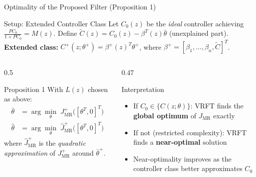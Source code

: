 \documentclass[aspectratio=169]{beamer}
\newcommand{\highlight}[1]{{\color{accentblue}\textbf{#1}}}
\begin{document}
\begin{frame}{Optimality of the Proposed Filter (Proposition 1)}
  \begin{block}{Setup: Extended Controller Class}
    Let $C_0(z)$ be the \emph{ideal} controller achieving $\frac{PC_0}{1+PC_0}=M(z)$.
    Define $\tilde{C}(z) = C_0(z) - \beta^T(z)\bar{\theta}$\; (unexplained part).\\[0.4em]
    \textbf{Extended class:} $C^+(z;\theta^+) = \beta^+(z)^T\theta^+$, where $\beta^+ = [\beta_1,\ldots,\beta_n,\tilde{C}]^T$.
  \end{block}
  \vspace{0.5em}
  \begin{columns}[T]
    \begin{column}{0.5\textwidth}
      \begin{exampleblock}{Proposition 1}
        With $L(z)$ chosen as above:
        \begin{align*}
          \bar{\theta} &= \arg\min_\theta\; J^+_{\mathrm{MR}}\bigl([\theta^T,0]^T\bigr)\\[0.3em]
          \hat{\theta} &= \arg\min_\theta\; \hat{J}^+_{\mathrm{MR}}\bigl([\theta^T,0]^T\bigr)
        \end{align*}
        where $\hat{J}^+_{\mathrm{MR}}$ is the \emph{quadratic approximation} of $J^+_{\mathrm{MR}}$ around $\bar{\theta}^+$.
      \end{exampleblock}
    \end{column}
    \begin{column}{0.47\textwidth}
      \begin{block}{Interpretation}
        \begin{itemize}
          \item If $C_0 \in \{C(z;\theta)\}$: VRFT finds the \highlight{global optimum} of $J_{\mathrm{MR}}$ exactly
          \item If not (restricted complexity): VRFT finds a \highlight{near-optimal} solution
          \item Near-optimality improves as the controller class better approximates $C_0$
        \end{itemize}
      \end{block}
    \end{column}
  \end{columns}
\end{frame}

\end{document}
